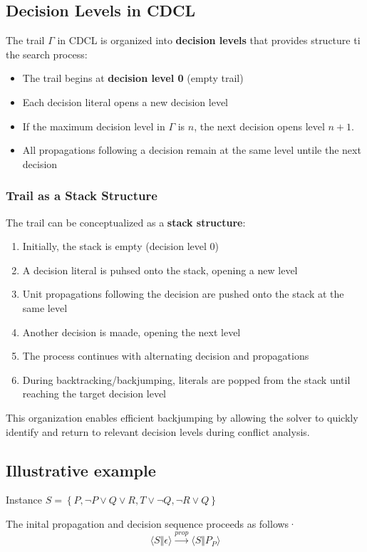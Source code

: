 \documentclass[a4paper]{article}
\theoremstyle{definition}
\begin{document}
\subsection{Decision Levels in CDCL}
The trail \( \varGamma \) in CDCL is organized into \textbf{decision levels} that provides
structure ti the search process:
\begin{itemize}
    \item The trail begins at \textbf{decision level 0} (empty trail)
    \item Each decision literal opens a new decision level 
    \item If the maximum decision level in \( \varGamma \) is \( n \), the next decision opens level \( n + 1 \).
    \item All propagations following a decision remain at the same level untile the next decision
\end{itemize}
\subsubsection{Trail as a Stack Structure}
The trail can be conceptualized as a \textbf{stack structure}:
\begin{enumerate}
    \item Initially, the stack is empty (decision level 0)
    \item A decision literal is puhsed onto the stack, opening a new level
    \item Unit propagations following the decision are pushed onto the stack at the same level 
    \item Another decision is maade, opening the next level 
    \item The process continues with alternating decision and propagations
    \item During backtracking/backjumping, literals are popped from the stack until reaching the target decision level
\end{enumerate}
This organization enables efficient backjumping by allowing the solver to quickly identify and 
return to relevant decision levels during conflict analysis.

\subsection{Illustrative example}
\begin{example}{Instance}
\centering \( S = \left\{ P, \lnot P \vee Q \vee R, T \vee \lnot Q, \lnot R \vee Q \right\} \)
\end{example}
The inital propagation and decision sequence proceeds as follows·
\[
  \langle S \Vert \epsilon \rangle \xrightarrow{prop} \langle S \Vert P_P \rangle
\]
\end{document}
